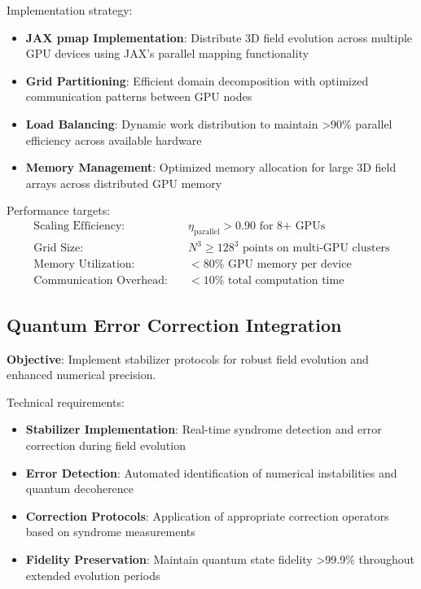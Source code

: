 \documentclass[11pt]{article}
\begin{document}
Implementation strategy:
\begin{itemize}
\item \textbf{JAX pmap Implementation}: Distribute 3D field evolution across multiple GPU devices using JAX's parallel mapping functionality
\item \textbf{Grid Partitioning}: Efficient domain decomposition with optimized communication patterns between GPU nodes
\item \textbf{Load Balancing}: Dynamic work distribution to maintain >90\% parallel efficiency across available hardware
\item \textbf{Memory Management}: Optimized memory allocation for large 3D field arrays across distributed GPU memory
\end{itemize}

Performance targets:
\begin{align}
\text{Scaling Efficiency:} &\quad \eta_{\text{parallel}} > 0.90 \text{ for 8+ GPUs} \\
\text{Grid Size:} &\quad N^3 \geq 128^3 \text{ points on multi-GPU clusters} \\
\text{Memory Utilization:} &\quad <80\% \text{ GPU memory per device} \\
\text{Communication Overhead:} &\quad <10\% \text{ total computation time}
\end{align}

\subsection{Quantum Error Correction Integration}

\textbf{Objective}: Implement stabilizer protocols for robust field evolution and enhanced numerical precision.

Technical requirements:
\begin{itemize}
\item \textbf{Stabilizer Implementation}: Real-time syndrome detection and error correction during field evolution
\item \textbf{Error Detection}: Automated identification of numerical instabilities and quantum decoherence
\item \textbf{Correction Protocols}: Application of appropriate correction operators based on syndrome measurements
\item \textbf{Fidelity Preservation}: Maintain quantum state fidelity >99.9\% throughout extended evolution periods
\end{itemize}
\end{document}
